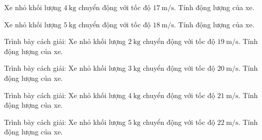 \begin{ex}
Xe nhỏ khối lượng $4\ \mathrm{kg}$ chuyển động với tốc độ $17\ \mathrm{m/s}$. Tính động lượng của xe.
\end{ex}

\begin{ex}
Xe nhỏ khối lượng $5\ \mathrm{kg}$ chuyển động với tốc độ $18\ \mathrm{m/s}$. Tính động lượng của xe.
\end{ex}

\begin{bt}
Trình bày cách giải: Xe nhỏ khối lượng $2\ \mathrm{kg}$ chuyển động với tốc độ $19\ \mathrm{m/s}$. Tính động lượng của xe.
\end{bt}

\begin{bt}
Trình bày cách giải: Xe nhỏ khối lượng $3\ \mathrm{kg}$ chuyển động với tốc độ $20\ \mathrm{m/s}$. Tính động lượng của xe.
\end{bt}

\begin{bt}
Trình bày cách giải: Xe nhỏ khối lượng $4\ \mathrm{kg}$ chuyển động với tốc độ $21\ \mathrm{m/s}$. Tính động lượng của xe.
\end{bt}

\begin{bt}
Trình bày cách giải: Xe nhỏ khối lượng $5\ \mathrm{kg}$ chuyển động với tốc độ $22\ \mathrm{m/s}$. Tính động lượng của xe.
\end{bt}

